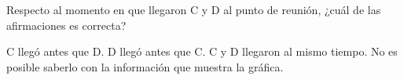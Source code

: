 Respecto al momento en que llegaron C y D al punto de reunión, ¿cuál de las afirmaciones es correcta?

\begin{choices}
    \choice C llegó antes que D.
    \choice D llegó antes que C.
    \CorrectChoice C y D llegaron al mismo tiempo.
    \choice No es posible saberlo con la información que muestra la gráfica.
\end{choices}